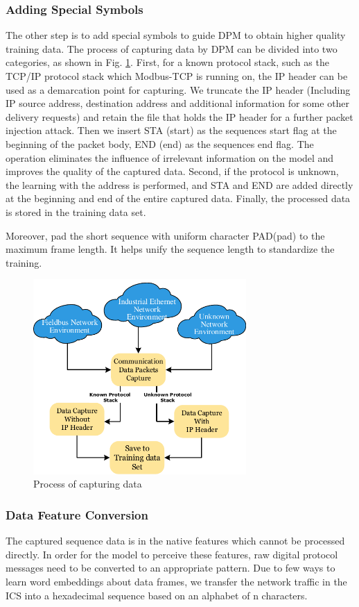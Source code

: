 \subsubsection{Adding Special Symbols}
The other step is to add special symbols to guide DPM to obtain higher quality training data. The process of capturing data by DPM can be divided into two categories, as shown in Fig. \ref{FigAddSpecialSymbols}. First, for a known protocol stack, such as the TCP/IP protocol stack which Modbus-TCP is running on, the IP header can be used as a demarcation point for capturing. We truncate the IP header (Including IP source address, destination address and additional information for some other delivery requests) and retain the file that holds the IP header for a further packet injection attack.  Then we insert STA (start) as the sequences start flag at the beginning of the packet body, END (end) as the sequences end flag. The operation eliminates the influence of irrelevant information on the model and improves the quality of the captured data. Second, if the protocol is unknown, the learning with the address is performed, and STA and END are added directly at the beginning and end of the entire captured data. Finally, the processed data is stored in the training data set.

Moreover, pad the short sequence with uniform character PAD(pad) to the maximum frame length. It helps unify the sequence length to standardize the training.
\begin{figure}[htbp]
	\centering
	\includegraphics[width=3.2in]{FIGURE_LV/FigAddSpecialSymbols.pdf}
	\caption{Process of capturing data}
	\label{FigAddSpecialSymbols}
\end{figure}

\subsubsection{Data Feature Conversion}
The captured sequence data is in the native features which cannot be processed directly. In order for the model to perceive these features, raw digital protocol messages need to be converted to an appropriate pattern. Due to few ways to learn word embeddings \cite{levy2014neural} about data frames, we transfer the network traffic in the ICS into a hexadecimal sequence based on an alphabet of n characters.

